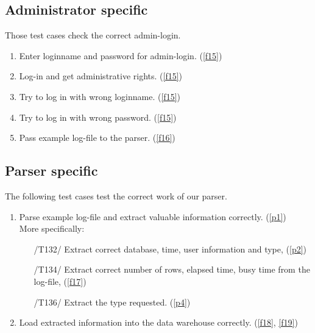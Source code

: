 \subsection{Administrator specific}

Those test cases check the correct admin-login.

\begin{enumerate}[resume*=test]

\item Enter loginname and password for admin-login. (\ref{f15})
\label{t17}

\item Log-in and get administrative rights. (\ref{f15})
\label{t18}

\item Try to log in with wrong loginname. (\ref{f15})
\label{t19}

\item Try to log in with wrong password. (\ref{f15})
\label{t20}

\item Pass example log-file to the parser. (\ref{f16})
\label{t21}


\end{enumerate}

\newpage
\subsection{Parser specific}

The following test cases test the correct work of our parser.

\begin{enumerate}[resume*=test]

\item Parse example log-file and extract valuable information correctly. (\ref{p1})
	\\ More specifically: 
\label{t22}
  \begin{enumerate}

	\item[/T132/] Extract correct database, time, user information 
	and type, (\ref{p2})
\label{t23}

	\item[/T134/] Extract correct number of rows, elapsed time, 
	busy time from the log-file, (\ref{f17})
\label{t24}	
	
	\item[/T136/] Extract the type requested. (\ref{p4})
\label{t25}

  \end{enumerate}

\item Load extracted information into the data warehouse correctly. (\ref{f18}, \ref{f19})
\label{t26}

\end{enumerate}


